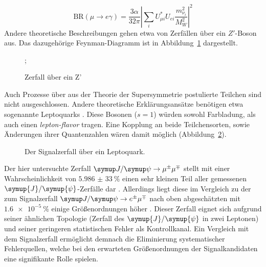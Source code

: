 %
\begin{equation}
  \label{eq:BRmuega}
  \text{BR}(\mu\rightarrow e\gamma)=\frac{3\alpha}{32\pi}\left|\sum_i U_{\mu i}^*U_{ei}\frac{m^2_{\nu_i}}{M^2_W}\right|^2
\end{equation}
%
Andere theoretische Beschreibungen gehen etwa von Zerfällen über ein $Z'$-Boson aus\cite{zprime}. Das dazugehörige Feynman-Diagramm ist in Abbildung~\ref{fig:Zprime} dargestellt.
%
\begin{figure}
  \centering
  ;
\caption{Zerfall über ein Z'}
\label{fig:Zprime}
\end{figure}
%
Auch Prozesse über aus der Theorie der Supersymmetrie postulierte Teilchen sind nicht ausgeschlossen\cite{susy_gut1}\cite{susy_gut2}. Andere theoretische Erklärungsansätze benötigen etwa sogenannte Leptoquarks \cite{leptoq}. Diese Bosonen ($s=1$) würden sowohl Farbladung, als auch einen \textit{lepton-flavor} tragen. Eine Kopplung an beide Teilchensorten, sowie Änderungen ihrer Quantenzahlen wären damit möglich (Abbildung~\ref{fig:lepto}).
%
\begin{figure}[H]
  \centering
    \caption{Der Signalzerfall über ein Leptoquark.}
    \label{fig:lepto}
  \end{figure}
%
Der hier untersuchte Zerfall $\kontroll$ stellt mit einer Wahrscheinlichkeit von $\SI{5,986(33)}{\percent}$ einen sehr kleinen Teil aller gemessenen $\symup{J}/\symup{\psi}$-Zerfälle dar \cite{pdg}. Allerdings liegt diese im Vergleich zu der zum Signalzerfall $\signal$ nach oben abgeschätzten mit $\SI{1,6e-5}{\percent}$ einige Größenordnungen höher \cite{pdg}. Dieser Zerfall eignet sich aufgrund seiner ähnlichen Topologie (Zerfall des $\symup{J}/\symup{\psi}$ in zwei Leptonen) und seiner geringeren statistischen Fehler als Kontrollkanal. Ein Vergleich mit dem Signalzerfall ermöglicht demnach die Eliminierung systematischer Fehlerquellen, welche bei den erwarteten Größenordnungen der Signalkandidaten eine signifikante Rolle spielen.
